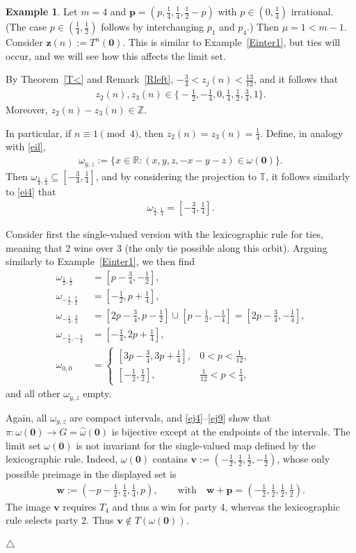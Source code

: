 \documentclass[11pt,reqno,tbtags,a4paper]{amsart}
\numberwithin{equation}{section}
\theoremstyle{plain}%
\theoremstyle{definition}
\newcommand\xqed[1]{%
    \leavevmode\unskip\penalty9999 \hbox{}\nobreak\hfill
    \quad\hbox{#1}}
\newtheorem{exampleqqq}[theorem]{Example}
\newenvironment{example}{\begin{exampleqqq}}
  {\xqed{$\triangle$}\end{exampleqqq}}
\theoremstyle{remark}
\newcounter{cases}
\newcommand{\refT}[1]{Theorem~\ref{#1}}
\newcommand{\refR}[1]{Remark~\ref{#1}}
\newcommand{\refE}[1]{Example~\ref{#1}}
\newcommand\set[1]{\ensuremath{\{#1\}}}
\newcommand\bigset[1]{\ensuremath{\bigl\{#1\bigr\}}}
\newcommand\bbR{\mathbb R}
\newcommand\bbT{\mathbb T}
\newcommand\bbZ{\mathbb Z}
\newcounter{cc}
\newcommand\cL{{\omega}}
\newcommand\hcL{\hat{\cL}}
\newcommand\vp{\mathbf{p}}
\newcommand\vv{\mathbf{v}}
\newcommand\vw{\mathbf{w}}
\newcommand\vz{\mathbf{z}}
\newcommand\0{{\boldsymbol 0}}
\newcommand\1{{\boldsymbol 1}}
\begin{document}
\begin{example}\label{Einter2}
   Let $m=4$ and $\vp=(p,\frac14,\frac14,\frac12-p)$ with $p\in(0,\frac14)$  
irrational.
(The case $p\in(\frac14,\frac12)$ follows by interchanging $p_1$ and $p_4$.)
Then $\mu=1<m-1$.
Consider $\vz(n):=T^n(\0)$.
This is similar to \refE{Einter1}, but ties will occur, and we will see how
this affects the limit set.


By \refT{T<} and \refR{Rleft}, $-\frac34< z_j(n)<\frac{13}{12}$, and it
follows that
\begin{align}
  z_2(n),z_3(n)\in\bigset{-\tfrac12,-\tfrac14,0,\tfrac14,\tfrac12,\tfrac34,1}
.\end{align}
Moreover, $z_2(n)-z_3(n)\in\bbZ$.

In particular, if $n\equiv 1\pmod4$, then $z_2(n)=z_3(n)=\frac14$.
Define, in analogy with \eqref{eil},
\begin{align}\label{ejl}
  \cL_{y,z}:=\set{x\in\bbR:(x,y,z,-x-y-z)\in \cL(\0)}.
\end{align}
Then $\cL_{\frac14,\frac14}\subseteq[-\frac34,\frac14]$, and by considering
the projection to $\bbT$, it follows similarly to \eqref{ei4} that
\begin{align}\label{ej4}
  \cL_{\frac14,\frac14}=[-\tfrac34,\tfrac14].
\end{align}

Consider first the single-valued version with
the lexicographic rule for ties, meaning that 2 wins over 3 (the only tie
possible along this orbit).
Arguing similarly to \refE{Einter1}, we then find
\begin{align}\label{ej5}
  \cL_{\frac12,\frac12}&=[p-\tfrac34,-\tfrac12],
\\\label{ej6}
  \cL_{-\frac12,\frac12}&=[-\tfrac12,p+\tfrac14],
\\\label{ej7}
  \cL_{-\frac14,\frac34}&=[2p-\tfrac34,p-\tfrac12]\cup[p-\tfrac12,-\tfrac14]
=[2p-\tfrac34,-\tfrac14],
\\\label{ej8}
  \cL_{-\frac14,-\frac14}&=[-\tfrac14,2p+\tfrac14],
\\\label{ej9}
\cL_{0,0}&=
           \begin{cases}
             [3p-\tfrac34,3p+\tfrac14], &0<p<\tfrac1{12},
\\
             [-\frac12,\frac12],
 &\tfrac1{12}<p<\tfrac14,
           \end{cases}
\end{align}
and all other $\cL_{y,z}$ empty.

Again, all $\cL_{y,z}$ are compact intervals, and
\eqref{ej4}--\eqref{ej9} show that $\pi:\cL(\0)\to G=\hcL(\0)$
is bijective except at the endpoints of the intervals.
The limit set $\cL(\0)$ is not invariant 
for the single-valued map defined by the lexicographic rule.
Indeed, $\cL(\0)$ contains $\vv:=(-\tfrac12,\tfrac12,\tfrac12,-\tfrac12)$,
whose only possible preimage in the displayed set is
\begin{align}
  \vw:=(-p-\tfrac12,\tfrac14,\tfrac14,p),\qquad
\text{with}\quad
 \vw+\vp=(-\tfrac12,\tfrac12,\tfrac12,\tfrac12).
\end{align}
The image $\vv$ requires $T_4$ and thus a win for party 4, 
whereas the lexicographic rule selects
party 2. Thus $\vv\notin T(\cL(\0))$.


\end{example}
\end{document}

